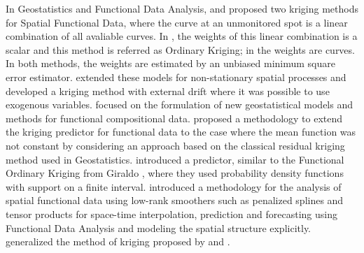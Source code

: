 \documentclass[]{interact}
\theoremstyle{plain}%
\theoremstyle{definition}
\theoremstyle{remark}
\begin{document}
In Geostatistics and Functional Data Analysis, \citet{giraldo2010continuous} and \citet{giraldo2011ordinary} proposed two kriging methods for Spatial Functional Data, where the curve at an
unmonitored spot is a linear combination of all avaliable curves. In \citet{giraldo2011ordinary}, the weights of this linear combination is a scalar and this method is referred as
Ordinary Kriging; in \citet{giraldo2010continuous} the weights are curves. In both methods, the weights are estimated by an unbiased minimum square error estimator.
\citet{caballero2013universal} extended these models for non-stationary spatial processes and \citet{ignaccolo2014kriging} developed a kriging method with external drift where it was possible to use exogenous variables.
\citet{menafoglio2014kriging} focused on the formulation of new geostatistical models and methods for functional compositional data.
\citet{reyesresidual} proposed a methodology to extend the kriging predictor for functional data to the case where the mean function was not constant by considering an approach based on the classical residual kriging method used in Geostatistics. \citet{salazar2015spatial} introduced a predictor, similar to the Functional Ordinary Kriging from Giraldo \citet{giraldo2011ordinary}, where they used probability density functions with support on a finite interval.
\citet{lee2015spatio} introduced a methodology for the analysis of spatial functional data using low-rank smoothers such as penalized splines and tensor products for space-time interpolation, prediction and forecasting using Functional Data Analysis and modeling the spatial structure explicitly.
\citet{nerini2010cokriging} generalized the method of kriging proposed by \citet{giraldo2010continuous} and \citet{giraldo2011ordinary}.
\end{document}
